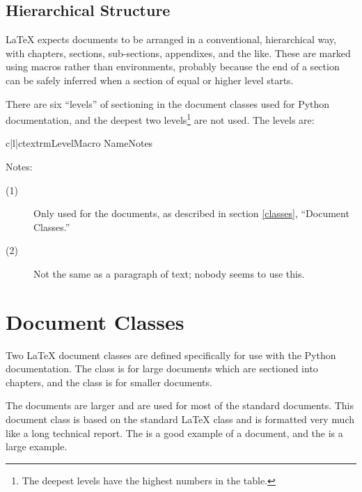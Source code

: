 \documentclass{howto}
\begin{document}
  \subsection{Hierarchical Structure}

    \LaTeX{} expects documents to be arranged in a conventional,
    hierarchical way, with chapters, sections, sub-sections,
    appendixes, and the like.  These are marked using macros rather
    than environments, probably because the end of a section can be
    safely inferred when a section of equal or higher level starts.

    There are six ``levels'' of sectioning in the document classes
    used for Python documentation, and the deepest two
    levels\footnote{The deepest levels have the highest numbers in the
      table.} are not used.  The levels are:

      \begin{tableiii}{c|l|c}{textrm}{Level}{Macro Name}{Notes}
      \end{tableiii}

    \noindent
    Notes:

    \begin{description}
      \item[(1)]
      Only used for the  documents, as described in
      section \ref{classes}, ``Document Classes.''
      \item[(2)]
      Not the same as a paragraph of text; nobody seems to use this.
    \end{description}


\section{Document Classes \label{classes}}

  Two \LaTeX{} document classes are defined specifically for use with
  the Python documentation.  The  class is for large
  documents which are sectioned into chapters, and the 
  class is for smaller documents.

  The  documents are larger and are used for most of the
  standard documents.  This document class is based on the standard
  \LaTeX{}  class and is formatted very much like a long
  technical report.  The  is a good example of a  document, and the
   is a large
  example.
\end{document}
